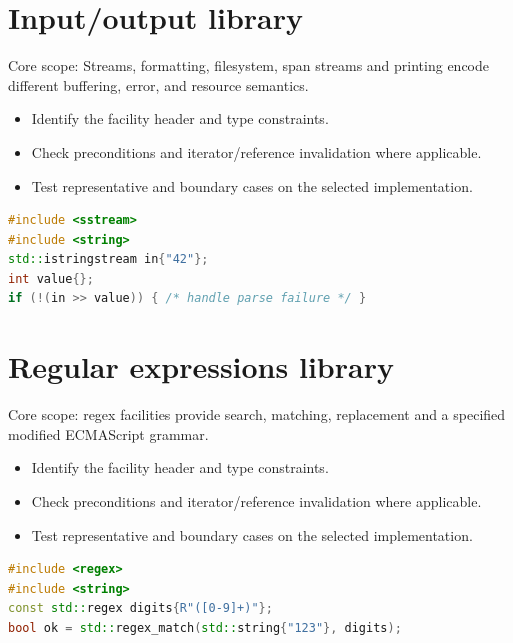 \documentclass[11pt]{article}
\begin{document}
\section{Input/output library}
Core scope: Streams, formatting, filesystem, span streams and printing encode different buffering, error, and resource semantics.

\begin{itemize}[leftmargin=*,itemsep=1pt,topsep=3pt]
\item Identify the facility header and type constraints.
\item Check preconditions and iterator/reference invalidation where applicable.
\item Test representative and boundary cases on the selected implementation.
\end{itemize}
\begin{lstlisting}[language=C++]
#include <sstream>
#include <string>
std::istringstream in{"42"};
int value{};
if (!(in >> value)) { /* handle parse failure */ }
\end{lstlisting}
\section{Regular expressions library}
Core scope: regex facilities provide search, matching, replacement and a specified modified ECMAScript grammar.

\begin{itemize}[leftmargin=*,itemsep=1pt,topsep=3pt]
\item Identify the facility header and type constraints.
\item Check preconditions and iterator/reference invalidation where applicable.
\item Test representative and boundary cases on the selected implementation.
\end{itemize}
\begin{lstlisting}[language=C++]
#include <regex>
#include <string>
const std::regex digits{R"([0-9]+)"};
bool ok = std::regex_match(std::string{"123"}, digits);
\end{lstlisting}
\end{document}
